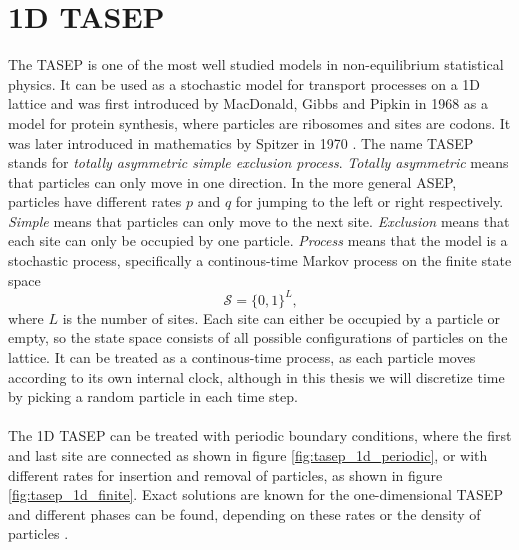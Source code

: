 \section{1D TASEP}
\label{sec:1d-tasep}
The TASEP is one of the most well studied models in non-equilibrium statistical physics. It can be used as a stochastic model for transport processes on a 1D lattice and was first introduced by MacDonald, Gibbs and Pipkin in 1968 \cite{macdonald_kinetics_1968} as a model for protein synthesis, where particles are ribosomes and sites are codons. It was later introduced in mathematics by Spitzer in 1970 \cite{spitzer_interaction_1970}. The name TASEP stands for \textit{totally asymmetric simple exclusion process}. \textit{Totally asymmetric} means that particles can only move in one direction. In the more general ASEP, particles have different rates $p$ and $q$ for jumping to the left or right respectively. \textit{Simple} means that particles can only move to the next site. \textit{Exclusion} means that each site can only be occupied by one particle. \textit{Process} means that the model is a stochastic process, specifically a continous-time Markov process on the finite state space
\begin{equation}
    \mathcal{S} = \{0, 1\}^L \text{,}
    \label{eq:state-space}
\end{equation}
where $L$ is the number of sites. Each site can either be occupied by a particle or empty, so the state space consists of all possible configurations of particles on the lattice. It can be treated as a continous-time process, as each particle moves according to its own internal clock, although in this thesis we will discretize time by picking a random particle in each time step.
\\
\\
The 1D TASEP can be treated with periodic boundary conditions, where the first and last site are connected as shown in figure \ref{fig:tasep_1d_periodic}, or with different rates for insertion and removal of particles, as shown in figure \ref{fig:tasep_1d_finite}. Exact solutions are known for the one-dimensional TASEP and different phases can be found, depending on these rates or the density of particles \cite{schutz_exact_1997,blythe_nonequilibrium_2007}.


